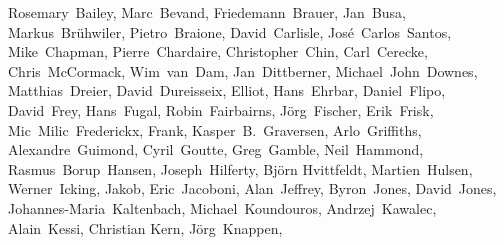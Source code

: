 { \flushleft\small
Rosemary~Bailey,        %
Marc~Bevand,            %
Friedemann~Brauer,      %
Jan~Busa,               %
Markus~Br\"uhwiler,     %
Pietro~Braione,         %
David~Carlisle,         %
Jos\'e~Carlos~Santos,   %
Mike~Chapman,           %
Pierre~Chardaire,       %
Christopher~Chin,       %
Carl~Cerecke,           %
Chris~McCormack,        %
Wim~van~Dam,            %
Jan~Dittberner,         %
Michael~John~Downes,    %
Matthias~Dreier,        %
David~Dureisseix,       %
Elliot,                 %
Hans~Ehrbar,            %
Daniel~Flipo,           %
David~Frey,             %
Hans~Fugal,             %
Robin~Fairbairns,       %
J\"org~Fischer,        %
Erik~Frisk,             %
Mic~Milic~Frederickx,   %
Frank,                  %
Kasper~B.~Graversen,    %
Arlo~Griffiths,         %
Alexandre~Guimond,      %
Cyril~Goutte,           %
Greg~Gamble,            %
Neil~Hammond,           %
Rasmus~Borup~Hansen,    %
Joseph~Hilferty,        %
Bj\"orn Hvittfeldt,     %
Martien~Hulsen,         %
Werner~Icking,          %
Jakob,                  %
Eric~Jacoboni,          %
Alan~Jeffrey,           %
Byron~Jones,            %
David~Jones,            %
Johannes-Maria~Kaltenbach, %
Michael~Koundouros,     %
Andrzej~Kawalec,        %
Alain~Kessi,            %
Christian Kern,         %
J\"org~Knappen,         %
}
